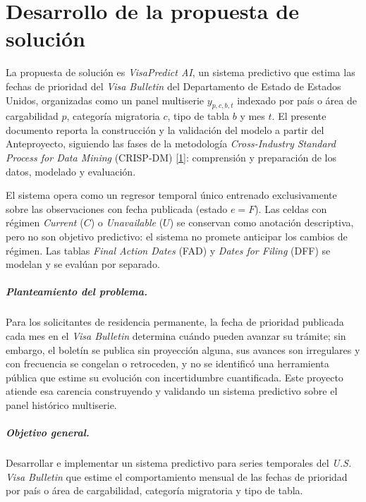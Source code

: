 \documentclass[12pt,letterpaper]{report}
\newcommand{\cita}[1]{\hyperref[bib:#1]{[#1]}}
\begin{document}
\chapter{Desarrollo de la propuesta de solución}

La propuesta de solución es \textit{VisaPredict AI}, un sistema predictivo que
estima las fechas de prioridad del \textit{Visa Bulletin} del Departamento de
Estado de Estados Unidos, organizadas como un panel multiserie
$y_{p,c,b,t}$ indexado por país o área de cargabilidad $p$, categoría migratoria
$c$, tipo de tabla $b$ y mes $t$. El presente documento reporta la construcción y
la validación del modelo a partir del Anteproyecto, siguiendo las fases de la
metodología \textit{Cross-Industry Standard Process for Data Mining} (CRISP-DM)
\cita{1}: comprensión y preparación de los datos, modelado y evaluación.

El sistema opera como un regresor temporal único entrenado exclusivamente sobre
las observaciones con fecha publicada (estado $e=F$). Las celdas con régimen
\textit{Current} ($C$) o \textit{Unavailable} ($U$) se conservan como anotación
descriptiva, pero no son objetivo predictivo: el sistema no promete anticipar los
cambios de régimen. Las tablas \textit{Final Action Dates} (FAD) y \textit{Dates
for Filing} (DFF) se modelan y se evalúan por separado.

\paragraph{Planteamiento del problema.} Para los solicitantes de residencia permanente, la
fecha de prioridad publicada cada mes en el \textit{Visa Bulletin} determina cuándo pueden
avanzar su trámite; sin embargo, el boletín se publica sin proyección alguna, sus avances
son irregulares y con frecuencia se congelan o retroceden, y no se identificó una
herramienta pública que estime su evolución con incertidumbre cuantificada. Este proyecto
atiende esa carencia construyendo y validando un sistema predictivo sobre el panel histórico
multiserie.

\paragraph{Objetivo general.} Desarrollar e implementar un sistema predictivo para series
temporales del \textit{U.S. Visa Bulletin} que estime el comportamiento mensual de las
fechas de prioridad por país o área de cargabilidad, categoría migratoria y tipo de tabla.
\end{document}
